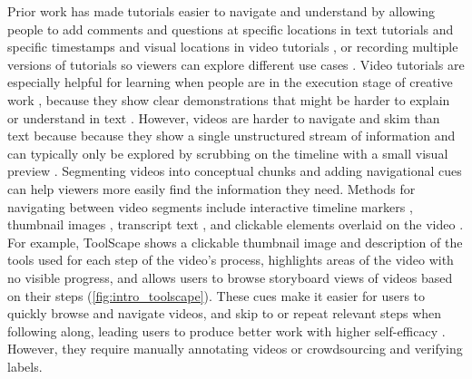 Prior work has made tutorials easier to navigate and understand by allowing people to add comments and questions at specific locations in text tutorials \cite{Bunt2014} and specific timestamps and visual locations in video tutorials \cite{AlamAnik2015}, or recording multiple versions of tutorials so viewers can explore different use cases \cite{Lafreniere2013}. Video tutorials are especially helpful for learning when people are in the execution stage of creative work \cite{Zhang2019}, because they show clear demonstrations that might be harder to explain or understand in text \cite{Chi2012, Pongnumkul2011, Grossman2010a}. However, videos are harder to navigate and skim than text because because they show a single unstructured stream of information and can typically only be explored by scrubbing on the timeline with a small visual preview \cite{Pavel2014, Pavel2015, Kim2014}. Segmenting videos into conceptual chunks \cite{Pongnumkul2011, Chi2012, Banovic2012, Nguyen2015, Grossman2010a, Matejka2011} and adding navigational cues \cite{Matejka2011, Grossman2010, Kim2014, Banovic2012, Kim2014a, Pongnumkul2011, Grossman2010a, Chi2012, Pavel2014, Nguyen2015} can help viewers more easily find the information they need. Methods for navigating between video segments include interactive timeline markers \cite{Matejka2011, Grossman2010, Kim2014, Banovic2012, Kim2014a}, thumbnail images \cite{Kim2014a, Pongnumkul2011, Banovic2012, Grossman2010a, Chi2012, Pavel2014}, transcript text \cite{Kim2014a}, and clickable elements overlaid on the video \cite{Nguyen2015}. For example, ToolScape \cite{Kim2014, Kim2013} shows a clickable thumbnail image and description of the tools used for each step of the video's process, highlights areas of the video with no visible progress, and allows users to browse storyboard views of videos based on their steps (\autoref{fig:intro_toolscape}). These cues make it easier for users to quickly browse and navigate videos, and skip to or repeat relevant steps when following along, leading users to produce better work with higher self-efficacy \cite{Kim2014, Kim2013}. However, they require manually annotating videos or crowdsourcing and verifying labels.

